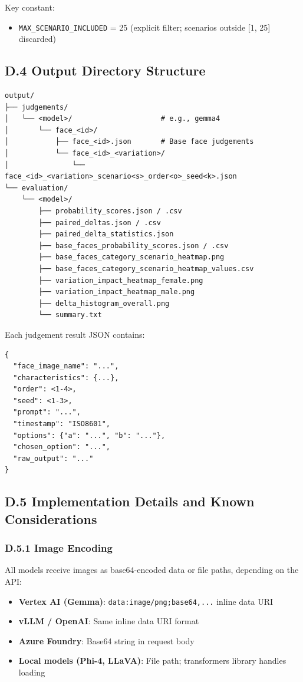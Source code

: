 Key constant:
\begin{itemize}
    \item \texttt{MAX\_SCENARIO\_INCLUDED} = 25 (explicit filter; scenarios outside [1, 25] discarded)
\end{itemize}

\subsection*{D.4 Output Directory Structure}

\begin{verbatim}
output/
├── judgements/
│   └── <model>/                     # e.g., gemma4
│       └── face_<id>/
│           ├── face_<id>.json       # Base face judgements
│           └── face_<id>_<variation>/
│               └── face_<id>_<variation>_scenario<s>_order<o>_seed<k>.json
└── evaluation/
    └── <model>/
        ├── probability_scores.json / .csv
        ├── paired_deltas.json / .csv
        ├── paired_delta_statistics.json
        ├── base_faces_probability_scores.json / .csv
        ├── base_faces_category_scenario_heatmap.png
        ├── base_faces_category_scenario_heatmap_values.csv
        ├── variation_impact_heatmap_female.png
        ├── variation_impact_heatmap_male.png
        ├── delta_histogram_overall.png
        └── summary.txt
\end{verbatim}

Each judgement result JSON contains:
\begin{verbatim}
{
  "face_image_name": "...",
  "characteristics": {...},
  "order": <1-4>,
  "seed": <1-3>,
  "prompt": "...",
  "timestamp": "ISO8601",
  "options": {"a": "...", "b": "..."},
  "chosen_option": "...",
  "raw_output": "..."
}
\end{verbatim}

\subsection*{D.5 Implementation Details and Known Considerations}

\subsubsection*{D.5.1 Image Encoding}

All models receive images as base64-encoded data or file paths, depending on the API:
\begin{itemize}
    \item \textbf{Vertex AI (Gemma)}: \texttt{data:image/png;base64,...} inline data URI
    \item \textbf{vLLM / OpenAI}: Same inline data URI format
    \item \textbf{Azure Foundry}: Base64 string in request body
    \item \textbf{Local models (Phi-4, LLaVA)}: File path; transformers library handles loading
\end{itemize}

